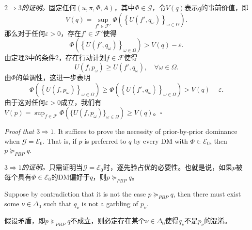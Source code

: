\documentclass[12pt,a4paper]{article}
\newenvironment{original}
  {\par\vspace{4pt}\noindent\color{black}\ignorespaces}
  {\par\vspace{2pt}}
\newenvironment{translation}
  {\par\vspace{2pt}\noindent\color{myblue}\ignorespaces}
  {\par\vspace{6pt}}
\newcommand{\Delt}{\Delta}
\newcommand{\calF}{\mathcal{F}}
\newcommand{\calE}{\mathcal{E}}
\begin{document}
\begin{translation}
\textit{$2\Rightarrow 3$的证明。}固定任何$(u,\pi,\Phi,A)$，其中$\Phi\in\mathcal{G}$，令$V(q)$表示$q$的事前价值，即
\begin{equation}
    V(q) = \sup_{f'\in\calF'} \Phi\left( \left\{ U(f', q_{\omega}) \right\}_{\omega\in\Omega} \right).
\end{equation}
那么对于任何$\varepsilon>0$，存在$f'\in\calF'$使得
\begin{equation}
    \Phi\left( \left\{ U(f', q_{\omega}) \right\}_{\omega\in\Omega} \right) > V(q) - \varepsilon.
\end{equation}
由定理3中的条件2，存在行动计划$f\in\calF$使得
\begin{equation}
    U(f,p_{\omega})\geq U(f',q_{\omega}),\quad\forall\omega\in\Omega.
\end{equation}
由$\Phi$的单调性，这进一步表明
\begin{equation}
    \Phi\left( \left\{ U(f, p_{\omega}) \right\}_{\omega\in\Omega} \right) \geq \Phi\left( \left\{ U(f', q_{\omega}) \right\}_{\omega\in\Omega} \right) > V(q) - \varepsilon.
\end{equation}
由于这对任何$\varepsilon>0$成立，我们有$V(p)=\sup_{f\in\calF} \Phi(\{U(f, p_{\omega})\}_{\omega\in\Omega}) \geq V(q)$。$\square$
\end{translation}

\begin{original}
\textit{Proof that $3\Rightarrow 1$.} It suffices to prove the necessity of prior-by-prior dominance when $\mathcal{G}=\calE_0$. That is, if $p$ is preferred to $q$ by every DM with $\Phi\in\calE_0$, then $p\succeq_{PBP} q$.
\end{original}

\begin{translation}
\textit{$3\Rightarrow 1$的证明。}只需证明当$\mathcal{G}=\calE_0$时，逐先验占优的必要性。也就是说，如果$p$被每个具有$\Phi\in\calE_0$的DM偏好于$q$，则$p\succeq_{PBP} q$。
\end{translation}

\begin{original}
Suppose by contradiction that it is not the case $p\succeq_{PBP} q$, then there must exist some $\nu\in\Delt_0$ such that $q_{\nu}$ is not a garbling of $p_{\nu}$.
\end{original}

\begin{translation}
假设矛盾，即$p\succeq_{PBP} q$不成立，则必定存在某个$\nu\in\Delt_0$使得$q_{\nu}$不是$p_{\nu}$的混淆。
\end{translation}
\end{document}
